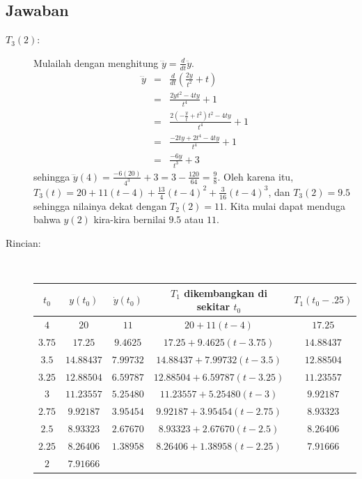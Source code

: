 \subsection*{Jawaban}
\begin{description}
\item [{$T_{3}(2)$:}] \label{ans:T3of2}Mulailah dengan menghitung $\dddot{y}=\frac{d}{dt}\ddot{y}$.
\begin{eqnarray*}
\dddot{y} & = & \frac{d}{dt}\left(\frac{2y}{t^{2}}+t\right)\\
 & = & \frac{2\dot{y}t^{2}-4ty}{t^{4}}+1\\
 & = & \frac{2\left(-\frac{y}{t}+t^{2}\right)t^{2}-4ty}{t^{4}}+1\\
 & = & \frac{-2ty+2t^{4}-4ty}{t^{4}}+1\\
 & = & \frac{-6y}{t^{3}}+3
\end{eqnarray*}
sehingga $\dddot{y}(4)=\frac{-6(20)}{4^{3}}+3=3-\frac{120}{64}=\frac{9}{8}$.
Oleh karena itu, $T_{3}(t)=20+11(t-4)+\frac{13}{4}(t-4)^{2}+\frac{3}{16}(t-4)^{3}$,
dan $T_{3}(2)=9.5$ sehingga nilainya dekat dengan $T_{2}(2)=11$.
Kita mulai dapat menduga bahwa $y(2)$ kira-kira bernilai $9.5$ atau
$11$.
\item [{Rincian:}] $\ $\label{ans:details}

\begin{center}
\begin{tabular}{c|c|c|c|c}
$t_{0}$ & $y(t_{0})$ & $\dot{y}(t_{0})$ & $T_{1}$ dikembangkan di sekitar $t_{0}$ & $T_{1}(t_{0}-.25)$\tabularnewline
\hline 
$4$ & $20$ & $11$ & $20+11(t-4)$ & $17.25$\tabularnewline
$3.75$ & $17.25$ & $9.4625$ & $17.25+9.4625(t-3.75)$ & $14.88437$\tabularnewline
$3.5$ & $14.88437$ & $7.99732$ & $14.88437+7.99732(t-3.5)$ & $12.88504$\tabularnewline
$3.25$ & $12.88504$ & $6.59787$ & $12.88504+6.59787(t-3.25)$ & $11.23557$\tabularnewline
$3$ & $11.23557$ & $5.25480$ & $11.23557+5.25480(t-3)$ & $9.92187$\tabularnewline
$2.75$ & $9.92187$ & $3.95454$ & $9.92187+3.95454(t-2.75)$ & $8.93323$\tabularnewline
$2.5$ & $8.93323$ & $2.67670$ & $8.93323+2.67670(t-2.5)$ & $8.26406$\tabularnewline
$2.25$ & $8.26406$ & $1.38958$ & $8.26406+1.38958(t-2.25)$ & $7.91666$\tabularnewline
$2$ & $7.91666$ &  &  & \tabularnewline
\end{tabular}
\par\end{center}
\end{description}

